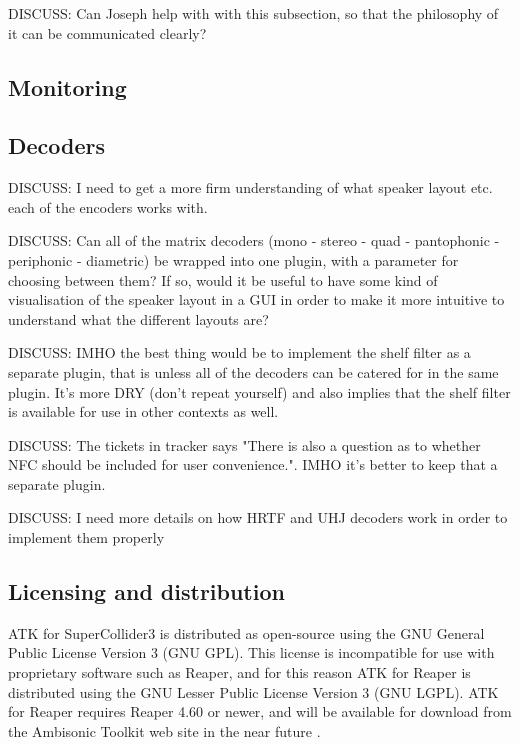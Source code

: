 \documentclass{article}
\begin{document}
DISCUSS: Can Joseph help with with this subsection, so that the philosophy of it can be communicated clearly?


\subsection{Monitoring}\label{sec:monitors}





\subsection{Decoders}\label{sec:decoders}

DISCUSS: I need to get a more firm understanding of what speaker layout etc. each of the encoders works with.

DISCUSS: Can all of the matrix decoders (mono - stereo - quad - pantophonic - periphonic - diametric) be wrapped into one plugin, with a parameter for choosing between them? If so, would it be useful to have some kind of visualisation of the speaker layout in a GUI in order to make it more intuitive to understand what the different layouts are?

DISCUSS: IMHO the best thing would be to implement the shelf filter as a separate plugin, that is unless all of the decoders can be catered for in the same plugin. It's more DRY (don't repeat yourself) and also implies that the shelf filter is available for use in other contexts as well.

DISCUSS: The tickets in tracker says "There is also a question as to whether NFC should be included for user convenience.". IMHO it's better to keep that a separate plugin.

DISCUSS: I need more details on how HRTF and UHJ decoders work in order to implement them properly




\subsection{Licensing and distribution}\label{sec:license}

ATK for SuperCollider3 is distributed as open-source using the GNU General Public License Version 3 (GNU GPL). This license is incompatible for use with proprietary software such as Reaper, and for this reason ATK for Reaper is distributed using the GNU Lesser Public License Version 3 (GNU LGPL).
ATK for Reaper requires Reaper 4.60 or newer, and will be available for download from the Ambisonic Toolkit web site in the near future \cite{ambisonictoolkit.net:2014}.
\end{document}
